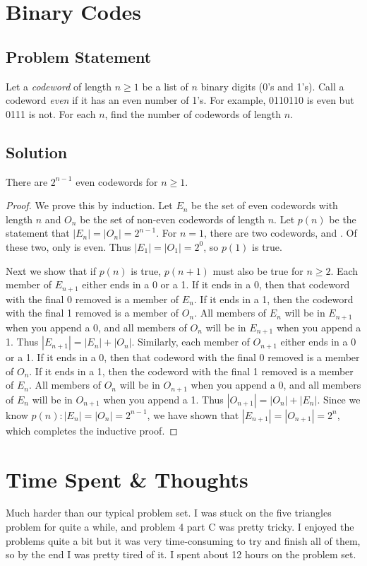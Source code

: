 \documentclass[12pt]{article}
\newcommand{\ProblemStatement}[1]{
\subsection*{Problem Statement}
#1
\subsection*{Solution}
}
\begin{document}
\section{Binary Codes}
\ProblemStatement{
Let a \emph{codeword} of length $n \ge 1$ be a list of $n$ binary digits (0's and 1's). Call a codeword \emph{even} if it has an even number of 1's. For example, 0110110 is even but 0111 is not. For each $n$, find the number of codewords of length $n$.
}

There are $2^{n-1}$ even codewords for $n \ge 1$.
\begin{proof}
We prove this by induction. Let $E_n$ be the set of even codewords with length $n$ and $O_n$ be the set of non-even codewords of length $n$. Let $p(n)$ be the statement that $|E_n| = |O_n| = 2^{n-1}$.  For $n = 1$, there are two codewords,  and . Of these two, only  is even. Thus $|E_1| = |O_1| = 2^0$, so $p(1)$ is true.

Next we show that if $p(n)$ is true, $p(n+1)$ must also be true for $n \ge 2$. Each member of $E_{n+1}$ either ends in a 0 or a 1. If it ends in a 0, then that codeword with the final 0 removed is a member of $E_n$. If it ends in a 1, then the codeword with the final 1 removed is a member of $O_n$. All members of $E_n$ will be in $E_{n+1}$ when you append a 0, and all members of $O_n$ will be in $E_{n+1}$ when you append a 1. Thus $|E_{n+1}| = |E_n| + |O_n|$. Similarly, each member of $O_{n+1}$ either ends in a 0 or a 1. If it ends in a 0, then that codeword with the final 0 removed is a member of $O_n$. If it ends in a 1, then the codeword with the final 1 removed is a member of $E_n$. All members of $O_n$ will be in $O_{n+1}$ when you append a 0, and all members of $E_n$ will be in $O_{n+1}$ when you append a 1. Thus $|O_{n+1}| = |O_n| + |E_n|$. Since we know  $p(n): |E_n| = |O_n| = 2^{n-1}$, we have shown that $|E_{n+1}| = |O_{n+1}| = 2^{n}$, which completes the inductive proof.
\end{proof}


\section{Time Spent \& Thoughts}

Much harder than our typical problem set. I was stuck on the five triangles problem for quite a while, and problem 4 part C was pretty tricky. I enjoyed the problems quite a bit but it was very time-consuming to try and finish all of them, so by the end I was pretty tired of it. I spent about 12 hours on the problem set.
\end{document}
